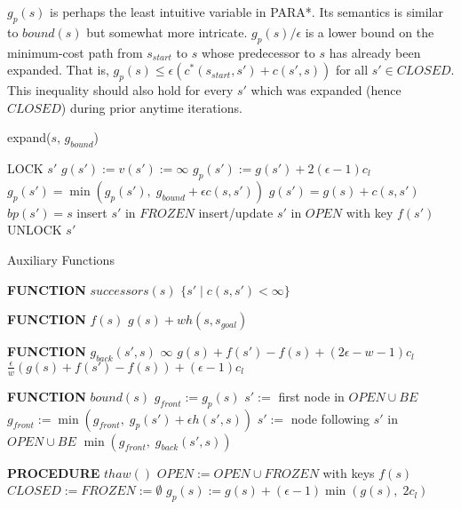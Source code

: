 \documentclass[letterpaper]{article}
\begin{document}
$g_p(s)$ is perhaps the least intuitive variable in PARA*. Its semantics is similar to $bound(s)$ but somewhat more intricate. $g_p(s)/\epsilon$ is a lower bound on the minimum-cost path from $s_{start}$ to $s$ whose predecessor to $s$ has already been expanded. That is, $g_p(s) \le \epsilon (c^*(s_{start},s') + c(s',s))$ for all $s'\in CLOSED$. This inequality should also hold for every $s'$ which was expanded (hence $CLOSED$) during prior anytime iterations.

\begin{algorithm}
\caption{expand($s$, $g_{bound}$)}
\label{alg:expand}
\begin{algorithmic}
\STATE LOCK $s'$
\STATE $g(s') := v(s') := \infty$
\ENDIF
\STATE $g_p(s') := g(s') + 2(\epsilon-1)c_l$
\ENDIF
\STATE $g_p(s') = \min(g_p(s'),\; g_{bound} + \epsilon c(s,s'))$
\STATE $g(s') = g(s) + c(s,s')$
\STATE $bp(s') = s$
\STATE insert $s'$ in $FROZEN$
\ELSE
\STATE insert/update $s'$ in $OPEN$ with key $f(s')$
\ENDIF
\ENDIF
\STATE UNLOCK $s'$
\ENDFOR
\end{algorithmic}
\end{algorithm}

\begin{algorithm}
\caption{Auxiliary Functions}
\label{alg:aux}
\begin{algorithmic}
\STATE \textbf{FUNCTION} $successors(s)$
\RETURN $\{s' \mid c(s,s')<\infty\}$

\STATE \textbf{FUNCTION} $f(s)$
\RETURN $g(s) + wh(s,s_{goal})$

\STATE \textbf{FUNCTION} $g_{back}(s',s)$
\RETURN $\infty$
\RETURN $g(s) + f(s') - f(s) + (2\epsilon-w-1)c_l$
\ELSE
\RETURN $\frac\epsilon w\left(g(s) + f(s') - f(s)\right) + (\epsilon-1)c_l$
\ENDIF

\STATE \textbf{FUNCTION} $bound(s)$
\STATE $g_{front} := g_p(s)$
\STATE $s' :=$ first node in $OPEN \cup BE$
\STATE $g_{front} := \min(g_{front},\;g_p(s') + \epsilon h(s',s))$
\STATE $s' :=$ node following $s'$ in $OPEN \cup BE$
\ENDWHILE
\RETURN $\min(g_{front},\;g_{back}(s',s))$

\STATE \textbf{PROCEDURE} $thaw()$
\STATE $OPEN := OPEN \cup FROZEN$ with keys $f(s)$
\STATE $CLOSED := FROZEN := \emptyset$
\STATE $g_p(s) := g(s) + (\epsilon-1)\min(g(s),\;2c_l)$
\ENDFOR
\end{algorithmic}
\end{algorithm}
\end{document}
